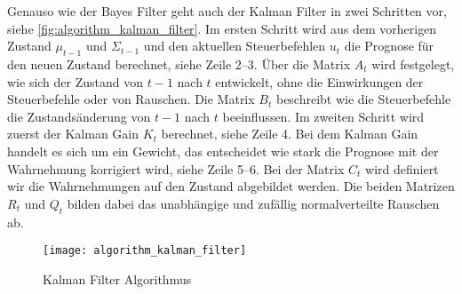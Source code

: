 Genauso wie der Bayes Filter geht auch der Kalman Filter in zwei Schritten vor, siehe \autoref{fig:algorithm_kalman_filter}. Im ersten Schritt wird aus dem vorherigen Zustand $\mu_{t-1}$ und $\Sigma_{t-1}$ und den aktuellen Steuerbefehlen $u_t$ die Prognose für den neuen Zustand berechnet, siehe Zeile 2--3. Über die Matrix $A_t$ wird festgelegt, wie sich der Zustand von $t-1$ nach $t$ entwickelt, ohne die Einwirkungen der Steuerbefehle oder von Rauschen. Die Matrix $B_t$ beschreibt wie die Steuerbefehle die Zustandsänderung von $t-1$ nach $t$ beeinflussen. Im zweiten Schritt wird zuerst der Kalman Gain $K_t$ berechnet, siehe Zeile 4. Bei dem Kalman Gain handelt es sich um ein Gewicht, das entscheidet wie stark die Prognose mit der Wahrnehmung korrigiert wird, siehe Zeile 5--6. Bei der Matrix $C_t$ wird definiert wir die Wahrnehmungen auf den Zustand abgebildet werden. Die beiden Matrizen $R_t$ und $Q_t$ bilden dabei das unabhängige und zufällig normalverteilte Rauschen ab.

\begin{figure}
	\centering
	\texttt{[image: algorithm\_kalman\_filter]}
	\caption{Kalman Filter Algorithmus \cite{thrun2005probabilistic}}
	\label{fig:algorithm_kalman_filter}
\end{figure}


